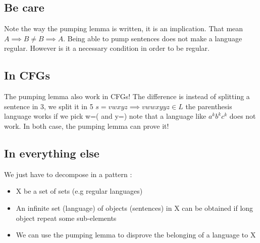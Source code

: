     \subsection{Be care}
        Note the way the pumping lemma is written, it is an implication. That
        mean $A \implies B \neq B \implies A$. Being able to pump sentences does
        not make a language regular. However is it a necessary condition in
        order to be regular.
    \subsection{In CFGs}
        The pumping lemma also work in CFGs! The difference is instead of
        splitting a sentence in 3, we split it in 5 $s = v w x y z \implies v w
        w x y y z \in L$ the parenthesis language works if we pick w=( and y=)
        note that a language like $a^k b^k c^k$ does not work. In both case, the
        pumping lemma can prove it!
    \subsection{In everything else}
        We just have to decompose in a pattern : 
        \begin{itemize}
            \item X be a set of sets (e.g regular languages)
            \item An infinite set (language) of objects (sentences) in X can be
            obtained if long object repeat some sub-elements 
            \item We can use the pumping lemma to disprove the belonging of a
            language to X
        \end{itemize}
